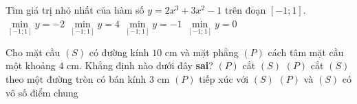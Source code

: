 \begin{ex}%
	 Tìm giá trị nhỏ nhất của hàm số $y=2x^3+3x^2-1$ trên đoạn $\left[-1;1 \right] $.
	\choice
	{$\min\limits_{\left[ -1;1\right] } y=-2$}
	{$\min\limits_{\left[ -1;1\right] } y=4$}
	{\True $\min\limits_{\left[ -1;1\right] } y=-1$}
	{$\min\limits_{\left[ -1;1\right] } y=0$}
	\end{ex}
\begin{ex}%
	 Cho mặt cầu $(S)$ có đường kính $10$ cm và mặt phẳng $(P)$ cách tâm mặt cầu một khoảng $4$ cm. Khẳng định nào dưới đây \textbf{sai}?
	\choice
	{$(P) $ cắt $ (S)$}
	{$(P)$ cắt $(S)$ theo một đường tròn có bán kính $3$ cm}
	{\True $(P)$ tiếp xúc với $(S)$}
	{$(P) $ và $(S)$ có vô số điểm chung}
	
\end{ex}

